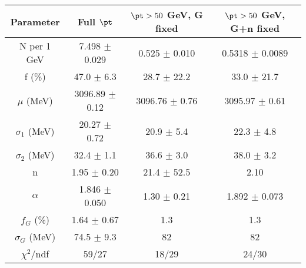 \begin{tabular}{c||c|c|c}
Parameter & Full $\pt$ & $\pt>50$ GeV, G fixed & $\pt>50$ GeV, G+n fixed \\
\hline
N per 1 GeV & 7.498 $\pm$ 0.029 & 0.525 $\pm$ 0.010 & 0.5318 $\pm$ 0.0089\\
f (\%) & 47.0 $\pm$ 6.3 & 28.7 $\pm$ 22.2 & 33.0 $\pm$ 21.7\\
$\mu$ (MeV) & 3096.89 $\pm$ 0.12 & 3096.76 $\pm$ 0.76 & 3095.97 $\pm$ 0.61\\
$\sigma_1$ (MeV) & 20.27 $\pm$ 0.72 & 20.9 $\pm$ 5.4 & 22.3 $\pm$ 4.8\\
$\sigma_2$ (MeV) & 32.4 $\pm$ 1.1 & 36.6 $\pm$ 3.0 & 38.0 $\pm$ 3.2\\
n & 1.95 $\pm$ 0.20 & 21.4 $\pm$ 52.5 & 2.10\\
$\alpha$ & 1.846 $\pm$ 0.050 & 1.30 $\pm$ 0.21 & 1.892 $\pm$ 0.073\\
$f_G$ (\%) & 1.64 $\pm$ 0.67 & 1.3 & 1.3\\
$\sigma_G$ (MeV) & 74.5 $\pm$ 9.3 & 82 & 82\\
\hline
$\chi^2$/ndf & 59/27 & 18/29 & 24/30\\
\end{tabular}
